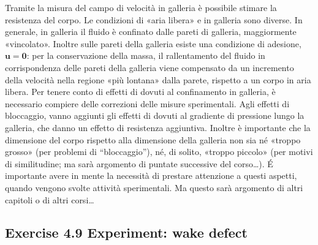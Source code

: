 \documentclass[letterpaper,10pt,italian]{jupyterBook}
\begin{document}
\sphinxAtStartPar
{} Tramite la misura del campo di velocità in galleria è
possibile stimare la resistenza del corpo. Le condizioni di «aria
libera» e in galleria sono diverse. In generale, in galleria il fluido è
confinato dalle pareti di galleria, maggiormente «vincolato». Inoltre
sulle pareti della galleria esiste una condizione di adesione,
\(\bm{u}=\bm{0}\): per la conservazione della massa, il rallentamento del
fluido in corrispondenza delle pareti della galleria viene compensato da
un incremento della velocità nella regione «più lontana» dalla parete,
rispetto a un corpo in aria libera. Per tenere conto di effetti di
 dovuti al confinamento in galleria, è necessario compiere
delle correzioni delle misure sperimentali. Agli effetti di bloccaggio,
vanno aggiunti gli effetti di  dovuti al gradiente di
pressione lungo la galleria, che danno un effetto di resistenza
aggiuntiva. Inoltre è importante che la dimensione del corpo rispetto
alla dimensione della galleria non sia né «troppo grosso» (per problemi
di “bloccaggio”), né, di solito, «troppo piccolo» (per motivi di
similitudine; ma sarà argomento di puntate successive del corso…). É
importante avere in mente la necessità di prestare attenzione a questi
aspetti, quando vengono svolte attività sperimentali. Ma questo sarà
argomento di altri capitoli o di altri corsi…

\sphinxstepscope


\subsection{Exercise 4.9 \sphinxhyphen{} Experiment: wake defect}
\label{\detokenize{polimi/fluidmechanics-ita/template/capitoli/04_bilanci/0401SciaExp:exercise-4-9-experiment-wake-defect}}\label{\detokenize{polimi/fluidmechanics-ita/template/capitoli/04_bilanci/0401SciaExp:fluid-mechanics-balances-ex-09}}\label{\detokenize{polimi/fluidmechanics-ita/template/capitoli/04_bilanci/0401SciaExp::doc}}
\end{document}
